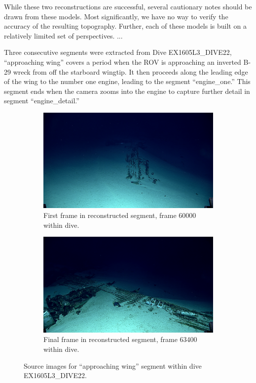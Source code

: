 \documentclass[letterpaper,12pt]{article}
\begin{document}
While these two reconstructions are successful, several cautionary notes should be drawn from these models.   Most significantly, we have no way to verify the accuracy of the resulting topography.   Further, each of these models is built on a relatively limited set of perspectives.   ...



Three consecutive segments were extracted from Dive EX1605L3\_DIVE22, ``approaching wing'' covers a period when the ROV is approaching an inverted B-29 wreck from off the starboard wingtip.  It then proceeds along the leading edge of the wing to the number one engine, leading to the segment ``engine\_one.''  This segment ends when the camera zooms into the engine to capture further detail in segment ``engine\_detail.''

\begin{figure}
    \centering
    \begin{subfigure}[b]{0.48\textwidth}
        \includegraphics[width=\textwidth]{images/image_060000.png}
        \caption{First frame in reconstructed segment, frame 60000 within dive.}
        \label{fig:ex1605l3_dive22_approaching_wing_begin}
    \end{subfigure}
    \begin{subfigure}[b]{0.48\textwidth}
        \includegraphics[width=\textwidth]{images/image_063400.png}
        \caption{Final frame in reconstructed segment, frame 63400 within dive.}
        \label{fig:ex1605l3_dive22_approaching_wing_end}
    \end{subfigure}
    \caption{Source images for ``approaching wing'' segment within dive EX1605L3\_DIVE22.}
\end{figure}
\end{document}
